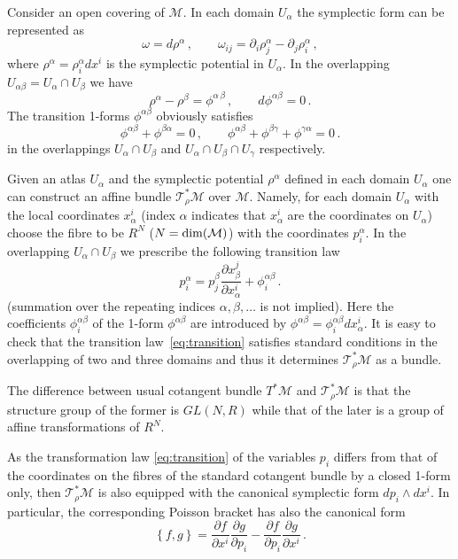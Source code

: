 \documentclass[a4paper,11pt,oneside]{amsart}
\theoremstyle{plain}
\numberwithin{equation}{section} %
\numberwithin{figure}{section} %
\newcommand{\pb}[2]{\left\{{}#1{},{}#2{}\right\}}
\renewcommand{\dim}[1]{{\rm dim}(#1)}
\def\d{\partial}
\def\mod{{\mathcal T}^*_\rho}
\def\manM{{\mathcal M}}
\begin{document}
\noindent
Consider an open covering of $\manM$.  In each
domain $U_\alpha$ the symplectic form can be represented as
\begin{equation} \label{eq:rho} \omega=d\rho^\alpha\,, \qquad
        \omega_{ij}=\d_i\rho^\alpha_j-\d_j\rho^\alpha_i\,,
\end{equation}
where $\rho^\alpha=\rho^\alpha_i d x^i$ is the symplectic potential
in $U_\alpha$.  In the overlapping $U_{\alpha \beta}=U_\alpha \cap
U_\beta$ we have
\begin{equation}
  \rho^\alpha-\rho^\beta=\phi^{\alpha\,\beta}\,, \qquad
  d\phi^{\alpha\beta}=0\,.
\end{equation}
The transition 1-forms $\phi^{\alpha\beta}$ obviously satisfies
\begin{equation}
\phi^{\alpha\beta}+\phi^{\beta\alpha}=0\,,\qquad
\phi^{\alpha\beta}+\phi^{\beta\gamma}+\phi^{\gamma\alpha}=0\,.
\end{equation}
in the overlappings $U_\alpha\cap U_\beta$ and
$U_\alpha\cap U_\beta \cap U_\gamma$ respectively.


\noindent
Given an atlas $U_\alpha$ and the symplectic
potential $\rho^\alpha$ defined in each domain $U_\alpha$
one can construct an affine bundle $\mod\manM$
over $\manM$. Namely, for each domain $U_\alpha$ with
the local coordinates $x_\alpha^i$ (index $\alpha$ indicates
that $x^i_\alpha$ are the coordinates on $U_\alpha$) choose
the fibre to be $R^N$ ($N=\dim{\manM}$) with the coordinates
$p^\alpha_i$.  In the overlapping $U_\alpha \cap U_\beta$ we
prescribe the following transition law
\begin{equation}
\label{eq:transition}
  p^\alpha_i=p^\beta_j \frac{\d x^j_\beta}{\d x^i_\alpha}
  +\phi^{\alpha \beta}_i\,.
\end{equation}
(summation over the repeating indices $\alpha,\beta,\ldots$
is not implied).  Here the coefficients $\phi^{\alpha \beta}_i$ of
the 1-form $\phi^{\alpha \beta}$ are introduced by
$\phi^{\alpha \beta}=\phi^{\alpha \beta}_i dx^i_\alpha$.
It is easy to check that the transition law~\eqref{eq:transition}
satisfies standard conditions in the overlapping of two and three
domains and thus it determines $\mod\manM$ as a bundle.

\noindent
The difference between usual cotangent bundle $T^*\manM$ and
$\mod\manM$ is that the structure group of the former is $GL(N,R)$
while that of the later is a group of affine transformations of $R^N$.


\noindent
As the transformation law \eqref{eq:transition} of the
variables $p_i$ differs from that of the coordinates on
the fibres of the standard cotangent bundle by a closed
1-form only, then $\mod\manM$ is also equipped with the
canonical symplectic form $d p_i \wedge d x^i$. In particular,
the corresponding Poisson bracket has also the canonical form
\begin{equation}
  \label{eq:FMPB}
  \pb{f}{g}=\frac{\d f}{\d x^i}\frac{\d g}{\d p_i}-
  \frac{\d f}{\d p_i}\frac{\d g}{\d x^i}\,.
\end{equation}
\end{document}

